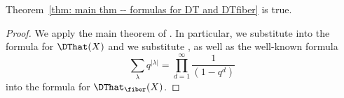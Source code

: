 \begin{corollary}
Theorem~\ref{thm: main thm -- formulas for DT and DTfiber} is true.
\end{corollary}
\begin{proof}
We apply the main theorem of \cite{Bryan-Kool-Young}. In particular, we substitute
\cite[Eqns~(2)\&(4)]{Bryan-Kool-Young} into the formula for $\DThat (X)$ and we substitute
\cite[Eqn~(1)]{Bryan-Kool-Young}, as well as the well-known formula
\[
\sum_{\lambda}q^{|\lambda |} =\prod_{d=1}^{\infty}\frac{1}{(1-q^{d})}
\]
into the formula for $\DThat_{\fiber } (X)$.
\end{proof}



